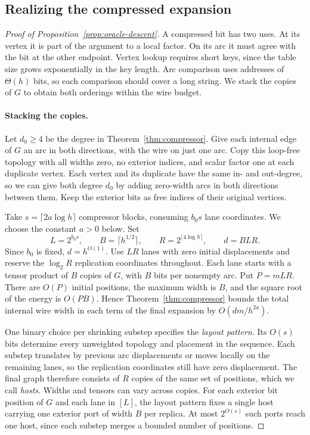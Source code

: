 \subsection{Realizing the compressed expansion}

\begin{proof}[Proof of Proposition~\ref{prop:oracle-descent}]
A compressed bit has two uses. At its vertex it is part of the
argument to a local factor. On its arc it must agree with the bit
at the other endpoint. Vertex lookup requires short keys, since the
table size grows exponentially in the key length. Arc comparison
uses addresses of $\Theta(h)$ bits, so each comparison should cover
a long string. We stack the copies of $G$ to obtain both orderings
within the wire budget.

\paragraph{Stacking the copies.}
Let $d_0\ge4$ be the degree in Theorem~\ref{thm:compressor}. Give each
internal edge of $G$ an arc in both directions, with the wire on just
one arc. Copy this loop-free topology with all widths zero, no
exterior indices, and scalar factor one at each duplicate vertex. Each
vertex and its duplicate have the same in- and out-degree, so we can give
both degree $d_0$ by adding zero-width arcs in both directions between
them. Keep the exterior bits as free indices of their original vertices.

Take $s=\lceil 2a\log h\rceil$ compressor blocks, consuming $b_0 s$
lane coordinates. We choose the constant $a>0$ below. Set
\[
 L=2^{b_0s},\qquad B=\lceil h^{1/2}\rceil,\qquad
 R=2^{\lceil4\log h\rceil},\qquad d=B L R .
\]
Since $b_0$ is fixed, $d=h^{O(1)}$. Use $LR$ lanes with zero initial
displacements and reserve the $\log_2 R$ replication coordinates
throughout. Each lane starts with a tensor product of $B$ copies of
$G$, with $B$ bits per nonempty arc. Put $P=mLR$. There are $O(P)$
initial positions, the maximum width is $B$, and the square root of
the energy is $O(PB)$. Hence Theorem~\ref{thm:compressor} bounds the
total internal wire width in each term of the final expansion by
$O(dm/h^{2a})$.

One binary choice per shrinking substep specifies the \emph{layout
pattern}. Its $O(s)$ bits determine every unweighted topology and
placement in the sequence. Each substep translates by previous arc
displacements or moves locally on the remaining lanes, so the
replication coordinates still have zero displacement. The final graph
therefore consists of $R$ copies of the same set of positions, which
we call \emph{hosts}. Widths and tensors can vary across copies. For
each exterior bit position of $G$ and each lane in $[L]$, the layout
pattern fixes a single host carrying one exterior port of width $B$
per replica. At most $2^{O(s)}$ such ports reach one host, since each
substep merges a bounded number of positions.


\end{proof}
